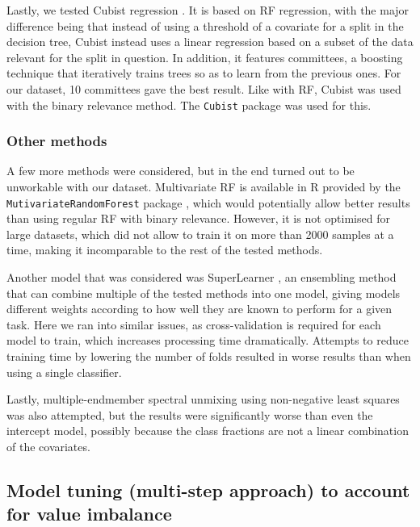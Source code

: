 \documentclass[review,authoryear,3p]{elsarticle}
\begin{document}

Lastly, we tested Cubist regression \citep{cubist}.
It is based on \gls{RF} regression, with the major difference being that instead of using a threshold of a covariate for a split in the decision tree, Cubist instead uses a linear regression based on a subset of the data relevant for the split in question.
In addition, it features committees, a boosting technique that iteratively trains trees so as to learn from the previous ones.
For our dataset, 10 committees gave the best result.
Like with \gls{RF}, Cubist was used with the binary relevance method.
The \texttt{Cubist} package \citep{cubistpackage} was used for this.

\subsubsection{Other methods}

A few more methods were considered, but in the end turned out to be unworkable with our dataset.
Multivariate \gls{RF} is available in R provided by the \texttt{MutivariateRandomForest} package \citep{MultivariateRandomForest}, which would potentially allow better results than using regular \gls{RF} with binary relevance.
However, it is not optimised for large datasets, which did not allow to train it on more than 2000 samples at a time, making it incomparable to the rest of the tested methods.

Another model that was considered was SuperLearner \citep{SuperLearner}, an ensembling method that can combine multiple of the tested methods into one model, giving models different weights according to how well they are known to perform for a given task.
Here we ran into similar issues, as cross-validation is required for each model to train, which increases processing time dramatically.
Attempts to reduce training time by lowering the number of folds resulted in worse results than when using a single classifier.

Lastly, multiple-endmember spectral unmixing using non-negative least squares \citep{franc2005sequential} was also attempted, but the results were significantly worse than even the intercept model, possibly because the class fractions are not a linear combination of the covariates.

\subsection{Model tuning (multi-step approach) to account for value imbalance}
\label{sec-multistep}
\end{document}
